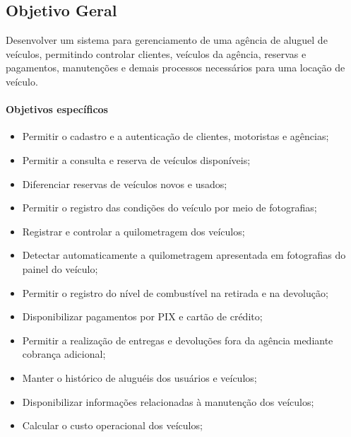 \documentclass[12pt,a4paper]{report}
\begin{document}
\subsection*{Objetivo Geral}
Desenvolver um sistema para gerenciamento de uma agência de aluguel de veículos, permitindo controlar clientes, veículos da agência, reservas e pagamentos, manutenções e demais processos necessários para uma locação de veículo.
    

	\paragraph{Objetivos específicos}
    \begin{itemize}

    \item Permitir o cadastro e a autenticação de clientes,
    motoristas e agências;

    \item Permitir a consulta e reserva de veículos disponíveis;

    \item Diferenciar reservas de veículos novos e usados;

    \item Permitir o registro das condições do veículo por meio
    de fotografias;

    \item Registrar e controlar a quilometragem dos veículos;

    \item Detectar automaticamente a quilometragem apresentada
    em fotografias do painel do veículo;

    \item Permitir o registro do nível de combustível na retirada
    e na devolução;

    \item Disponibilizar pagamentos por PIX e cartão de crédito;

    \item Permitir a realização de entregas e devoluções fora da
    agência mediante cobrança adicional;

    \item Manter o histórico de aluguéis dos usuários e veículos;

    \item Disponibilizar informações relacionadas à manutenção
    dos veículos;

    \item Calcular o custo operacional dos veículos;


\end{itemize}
\end{document}
